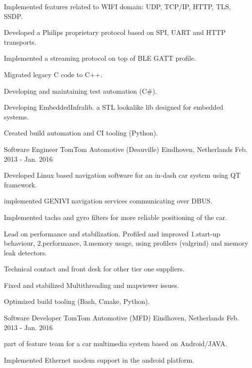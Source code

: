 \begin{cventries}
{\begin{cvitems}
        \item {Implemented features related to WIFI domain: UDP, TCP/IP, HTTP, TLS, SSDP.}
        \item {Developed a Philips proprietary protocol based on SPI, UART and HTTP transports.}
        \item {Implemented a streaming protocol on top of BLE GATT profile.}
        \item {Migrated legacy C code to C++.}
        \item {Developing and maintaining test automation (C\#).}
        \item {Developing EmbeddedInfralib. a STL lookalike lib designed for embedded systems.}
        \item {Created build automation and CI tooling (Python).}
      \end{cvitems}
    }
  \cventry
    {Software Engineer}
    {TomTom Automotive (Deauville)}
    {Eindhoven, Netherlands}
    {Feb. 2013 - Jan. 2016}
    {
      \begin{cvitems}
        \item {Developed Linux based navigation software for an in-dash car system using QT framework.}
        \item{implemented GENIVI navigation services communicating over DBUS.}
        \item {Implemented tacho and gyro filters for more reliable positioning of the car. }
        \item {Lead on performance and stabilization. Profiled and improved 1.start-up behaviour, 2.performance, 3.memory usage, using profilers (valgrind) and memory leak detectors.}
        \item {Technical contact and front desk for other tier one suppliers.}
        \item {Fixed and stabilized Multithreading and mapviewer issues.}
        \item {Optimized build tooling (Bash, Cmake, Python).}
      \end{cvitems}
    }
  \cventry
    {Software Developer}
    {TomTom Automotive (MFD)}
    {Eindhoven, Netherlands}
    {Feb. 2013 - Jan. 2016}
    {
      \begin{cvitems}
        \item {part of feature team for a car multimedia system based on Android/JAVA.}
        \item {Implemented Ethernet modem support in the android platform.}
      \end{cvitems} 
    }
\end{cventries}
\newpage

